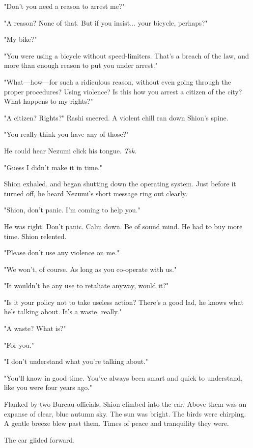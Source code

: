 "Don't you need a reason to arrest me?"

"A reason? None of that. But if you insist... your bicycle, perhaps?"

"My bike?"

"You were using a bicycle without speed-limiters. That's a breach of the
law, and more than enough reason to put you under arrest."

"What---how---for such a ridiculous reason, without even going through the
proper procedures? Using violence? Is this how you arrest a citizen of
the city? What happens to my rights?"

"A citizen? Rights?" Rashi sneered. A violent chill ran down Shion's
spine.

"You really think you have any of those?"

He could hear Nezumi click his tongue. \emph{Tsk.}

"Guess I didn't make it in time."

Shion exhaled, and began shutting down the operating system. Just before
it turned off, he heard Nezumi's short message ring out clearly.

"Shion, don't panic. I'm coming to help you."

\mybreak

He was right. Don't panic. Calm down. Be of sound mind. He had to buy
more time. Shion relented.

"Please don't use any violence on me."

"We won't, of course. As long as you co-operate with us."

"It wouldn't be any use to retaliate anyway, would it?"

"Is it your policy not to take useless action? There's a good lad, he
knows what he's talking about. It's a waste, really."

"A waste? What is?"

"For you."

"I don't understand what you're talking about."

"You'll know in good time. You've always been smart and quick to
understand, like you were four years ago."

Flanked by two Bureau officials, Shion climbed into the car. Above them
was an expanse of clear, blue autumn sky. The sun was bright. The birds
were chirping. A gentle breeze blew past them. Times of peace and
tranquility they were.

\myspace

The car glided forward.~

